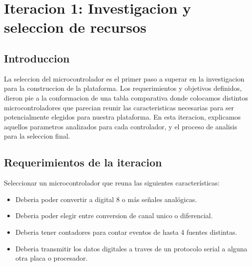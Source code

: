 \chapter{Iteracion 1: Investigacion y seleccion de recursos} %
\label{cha:iteracion_1}

\section{Introduccion} %
\label{it1:sec:introduccion}

La seleccion del microcontrolador es el primer paso a superar en la investigacion para la construccion de la plataforma. Los requerimientos y objetivos definidos, dieron pie a la conformacion de una tabla comparativa donde colocamos distintos microcontroladores que parecian reunir las caracteristicas necesarias para ser potencialmente elegidos para nuestra plataforma. En esta iteracion, explicamos aquellos parametros analizados para cada controlador, y el proceso de analisis para la seleccion final.




\section{Requerimientos de la iteracion} %
\label{it1:sec:requerimientos_de_la_iteracion}

Seleccionar un microcontrolador que reuna las siguientes características:
\begin{itemize}
  \item Deberia poder convertir a digital 8 o más señales analógicas.
  \item Deberia poder elegir entre conversion de canal unico o diferencial.
  \item Deberia tener contadores para contar eventos de hasta 4 fuentes distintas.
  \item Deberia transmitir los datos digitales a traves de un protocolo serial a alguna otra placa o procesador.
\end{itemize}



